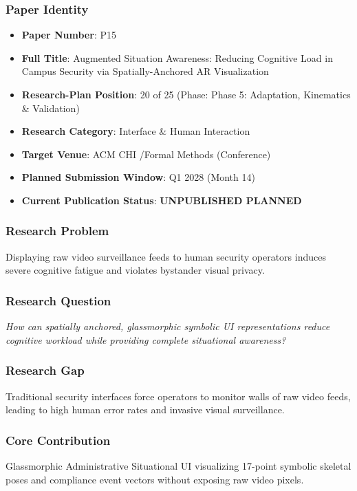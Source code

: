 \documentclass[11pt,letterpaper]{article}
\begin{document}
\subsubsection{Paper Identity}
\begin{itemize}[leftmargin=*]
    \item \textbf{Paper Number}: P15
    \item \textbf{Full Title}: Augmented Situation Awareness: Reducing Cognitive Load in Campus Security via Spatially-\allowbreak Anchored AR Visualization
    \item \textbf{Research-Plan Position}: 20 of 25 (Phase: Phase 5: Adaptation, Kinematics \& Validation)
    \item \textbf{Research Category}: Interface \& Human Interaction
    \item \textbf{Target Venue}: ACM CHI /\allowbreak  Formal Methods (Conference)
    \item \textbf{Planned Submission Window}: Q1 2028 (Month 14)
    \item \textbf{Current Publication Status}: \textbf{UNPUBLISHED PLANNED}
\end{itemize}

\subsubsection{Research Problem}
Displaying raw video surveillance feeds to human security operators induces severe cognitive fatigue and violates bystander visual privacy.

\subsubsection{Research Question}
\begin{tcolorbox}[colback=blue!3!white,colframe=blue!50!black,title=Primary Scientific Question]
\textit{How can spatially anchored, glassmorphic symbolic UI representations reduce cognitive workload while providing complete situational awareness?}
\end{tcolorbox}

\subsubsection{Research Gap}
Traditional security interfaces force operators to monitor walls of raw video feeds, leading to high human error rates and invasive visual surveillance.

\subsubsection{Core Contribution}
Glassmorphic Administrative Situational UI visualizing 17-\allowbreak point symbolic skeletal poses and compliance event vectors without exposing raw video pixels.
\end{document}
